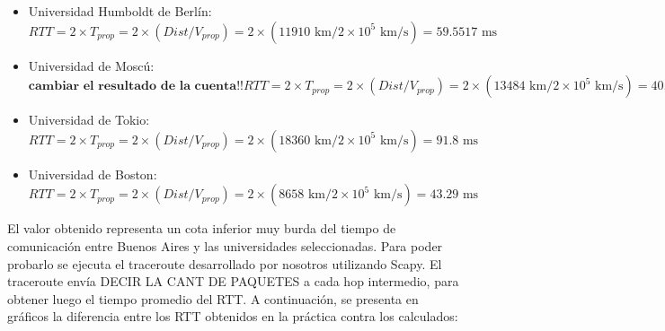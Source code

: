 \begin{itemize}
 \item Universidad Humboldt de Berlín:
\begin{equation}
 	RTT = 2 \times T_{prop} = 2 \times (Dist / V_{prop}) = 2 \times (11910 \text{ km} / 2\times10^5 \text{ km/s}) = 59.5517  \text{ ms}
\end{equation}

 \item Universidad de Moscú:
 \begin{equation}
	\textbf{cambiar el resultado de la cuenta!!}
 	RTT = 2 \times T_{prop} = 2 \times (Dist / V_{prop}) = 2 \times (13484 \text{ km} / 2\times10^5 \text{ km/s}) = 40.655 \text{ ms}
 \end{equation}

 \item Universidad de Tokio:
 \begin{equation}
 	RTT = 2 \times T_{prop} = 2 \times (Dist / V_{prop}) = 2 \times (18360  \text{ km} / 2\times10^5 \text{ km/s}) = 91.8 \text{ ms}
 \end{equation}

 \item Universidad de Boston:
 \begin{equation}
 	RTT = 2 \times T_{prop} = 2 \times (Dist / V_{prop}) = 2 \times (8658 \text{ km} / 2\times10^5 \text{ km/s}) = 43.29 \text{ ms}
 \end{equation}

\end{itemize}

El valor obtenido representa un cota inferior muy burda del tiempo de comunicación entre Buenos Aires y las universidades seleccionadas. Para poder probarlo se ejecuta el traceroute desarrollado por nosotros utilizando Scapy. El traceroute envía DECIR LA CANT DE PAQUETES a cada hop intermedio, para obtener luego el tiempo promedio del RTT. A continuación, se presenta en gráficos la diferencia entre los RTT obtenidos en la práctica contra los calculados:




